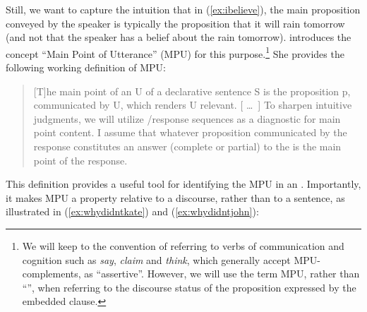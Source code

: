 \documentclass[output=paper]{langsci/langscibook}
\begin{document}
Still, we want to capture the intuition that in (\ref{ex:ibelieve}), the main proposition conveyed by the speaker is typically the proposition that it will rain tomorrow (and not that the speaker has a belief about the rain tomorrow). \cite{Simons2007} introduces the concept ``Main Point of Utterance'' (MPU) for this purpose.\footnote{We will keep to the convention of referring to verbs of communication and cognition such as \textit{say}, \textit{claim} and \textit{think}, which generally accept MPU-complements, as ``assertive''. However, we will use the term MPU, rather than ``'', when referring to the discourse status of the proposition expressed by the embedded clause. } She provides the following working definition of MPU:

\begin{quote}
	[T]he main point of an  U of a declarative sentence S is the proposition p, communicated by U, which renders U relevant. [ \ldots\ ] To sharpen intuitive judgments, we will utilize /response sequences as a diagnostic for main point content. I assume that whatever proposition communicated by the response constitutes an answer (complete or partial) to the  is the main point of the response. \citep[1035--1036]{Simons2007}
\end{quote}

This definition provides a useful tool for identifying the MPU in an . Importantly, it makes MPU a property relative to a discourse, rather than to a sentence, as illustrated in (\ref{ex:whydidntkate}) and (\ref{ex:whydidntjohn}):


\end{document}
